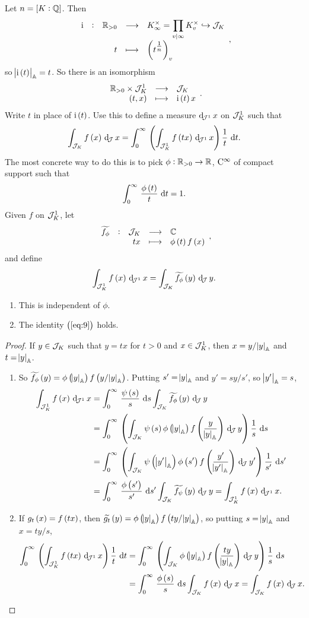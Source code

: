Let $ n = \sbr{K : \QQ} $. Then
$$ \function[\i]{\RR_{> 0}}{K_\infty^\times = \prod_{v \mid \infty} K_v^\times \hookrightarrow \JJJ_K}{t}{\br{t^{\tfrac{1}{n}}}_v}, $$
so $ \abs{\i\br{t}}_\AA = t $. So there is an isomorphism
$$ \function{\RR_{> 0} \times \JJJ_K^1}{\JJJ_K}{\br{t, x}}{\i\br{t}x}. $$
Write $ t $ in place of $ \i\br{t} $. Use this to define a measure $ \dJI x $ on $ \mathcal{J}_K^1 $ such that
\begin{equation}
\label{eq:9}
\intJ{f\br{x}}{x} = \intd{0}{\infty}{\br{\intJI{f\br{tx}}{x}}\dfrac{1}{t}}{t}.
\end{equation}
The most concrete way to do this is to pick $ \phi : \mathbb{R}_{> 0} \to \mathbb{R} $, $ \mathrm{C}^\infty $ of compact support such that
$$ \intd{0}{\infty}{\dfrac{\phi\br{t}}{t}}{t} = 1. $$
Given $ f $ on $ \mathcal{J}_K^1 $, let
$$ \function[\widetilde{f_\phi}]{\JJJ_K}{\CC}{tx}{\phi\br{t}f\br{x}}, $$
and define
$$ \intJI{f\br{x}}{x} = \intJ{\widetilde{f_\phi}\br{y}}{y}. $$

\pagebreak

\begin{lemma}
\hfill
\begin{enumerate}
\item This is independent of $ \phi $.
\item The identity $ \br{\ref{eq:9}} $ holds.
\end{enumerate}
\end{lemma}

\begin{proof}
If $ y \in \mathcal{J}_K $ such that $ y = tx $ for $ t > 0 $ and $ x \in \mathcal{J}_K^1 $, then $ x = y / \abs{y}_{\mathbb{A}} $ and $ t = \abs{y}_{\mathbb{A}} $.
\begin{enumerate}
\item So $ \widetilde{f_\phi}\br{y} = \phi\br{\abs{y}_\AA}f\br{y / \abs{y}_\AA} $. Putting $ s' = \abs{y}_{\mathbb{A}} $ and $ y' = sy / s' $, so $ \abs{y'}_{\mathbb{A}} = s $,
\begin{align*}
\intJI{f\br{x}}{x}
& = \intd{0}{\infty}{\dfrac{\psi\br{s}}{s}}{s}\intJ{\widetilde{f_\phi}\br{y}}{y} \\
& = \intd{0}{\infty}{\br{\intJ{\psi\br{s}\phi\br{\abs{y}_\AA}f\br{\dfrac{y}{\abs{y}_\AA}}}{y}}\dfrac{1}{s}}{s} \\
& = \intd{0}{\infty}{\br{\intJ{\psi\br{\abs{y'}_\AA}\phi\br{s'}f\br{\dfrac{y'}{\abs{y'}_\AA}}}{y'}}\dfrac{1}{s'}}{s'} \\
& = \intd{0}{\infty}{\dfrac{\phi\br{s'}}{s'}}{s'}\intJ{\widetilde{f_\psi}\br{y}}{y}
= \intJI{f\br{x}}{x}.
\end{align*}
\item If $ g_t\br{x} = f\br{tx} $, then $ \widetilde{g_t}\br{y} = \phi\br{\abs{y}_\AA}f\br{ty / \abs{y}_\AA} $, so putting $ s = \abs{y}_{\mathbb{A}} $ and $ x = ty / s $,
\begin{align*}
\intd{0}{\infty}{\br{\intJI{f\br{tx}}{x}}\dfrac{1}{t}}{t}
& = \intd{0}{\infty}{\br{\intJ{\phi\br{\abs{y}_\AA}f\br{\dfrac{ty}{\abs{y}_\AA}}}{y}}\dfrac{1}{s}}{s} \\
& = \intd{0}{\infty}{\dfrac{\phi\br{s}}{s}}{s}\intJ{f\br{x}}{x}
= \intJ{f\br{x}}{x}.
\end{align*}
\end{enumerate}
\end{proof}

